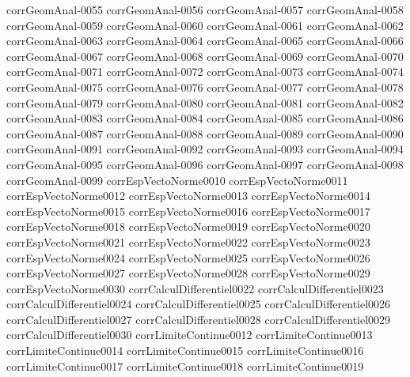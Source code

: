 {corrGeomAnal-0055}
{corrGeomAnal-0056}
{corrGeomAnal-0057}
{corrGeomAnal-0058}
{corrGeomAnal-0059}
{corrGeomAnal-0060}
{corrGeomAnal-0061}
{corrGeomAnal-0062}
{corrGeomAnal-0063}
{corrGeomAnal-0064}
{corrGeomAnal-0065}
{corrGeomAnal-0066}
{corrGeomAnal-0067}
{corrGeomAnal-0068}
{corrGeomAnal-0069}
{corrGeomAnal-0070}
{corrGeomAnal-0071}
{corrGeomAnal-0072}
{corrGeomAnal-0073}
{corrGeomAnal-0074}
{corrGeomAnal-0075}
{corrGeomAnal-0076}
{corrGeomAnal-0077}
{corrGeomAnal-0078}
{corrGeomAnal-0079}
{corrGeomAnal-0080}
{corrGeomAnal-0081}
{corrGeomAnal-0082}
{corrGeomAnal-0083}
{corrGeomAnal-0084}
{corrGeomAnal-0085}
{corrGeomAnal-0086}
{corrGeomAnal-0087}
{corrGeomAnal-0088}
{corrGeomAnal-0089}
{corrGeomAnal-0090}
{corrGeomAnal-0091}
{corrGeomAnal-0092}
{corrGeomAnal-0093}
{corrGeomAnal-0094}
{corrGeomAnal-0095}
{corrGeomAnal-0096}
{corrGeomAnal-0097}
{corrGeomAnal-0098}
{corrGeomAnal-0099}
{corrEspVectoNorme0010}
{corrEspVectoNorme0011}
{corrEspVectoNorme0012}
{corrEspVectoNorme0013}
{corrEspVectoNorme0014}
{corrEspVectoNorme0015}
{corrEspVectoNorme0016}
{corrEspVectoNorme0017}
{corrEspVectoNorme0018}
{corrEspVectoNorme0019}
{corrEspVectoNorme0020}
{corrEspVectoNorme0021}
{corrEspVectoNorme0022}
{corrEspVectoNorme0023}
{corrEspVectoNorme0024}
{corrEspVectoNorme0025}
{corrEspVectoNorme0026}
{corrEspVectoNorme0027}
{corrEspVectoNorme0028}
{corrEspVectoNorme0029}
{corrEspVectoNorme0030}
{corrCalculDifferentiel0022}
{corrCalculDifferentiel0023}
{corrCalculDifferentiel0024}
{corrCalculDifferentiel0025}
{corrCalculDifferentiel0026}
{corrCalculDifferentiel0027}
{corrCalculDifferentiel0028}
{corrCalculDifferentiel0029}
{corrCalculDifferentiel0030}
{corrLimiteContinue0012}
{corrLimiteContinue0013}
{corrLimiteContinue0014}
{corrLimiteContinue0015}
{corrLimiteContinue0016}
{corrLimiteContinue0017}
{corrLimiteContinue0018}
{corrLimiteContinue0019}
